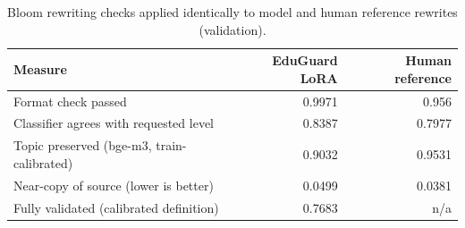 \begin{table}[t]
\centering
\caption{Bloom rewriting checks applied identically to model and human reference rewrites (validation).}
\label{tab:t7_bloom_model_vs_reference}
\begin{tabular}{lrr}
\toprule
Measure & EduGuard LoRA & Human reference \\
\midrule
Format check passed & 0.9971 & 0.956 \\
Classifier agrees with requested level & 0.8387 & 0.7977 \\
Topic preserved (bge-m3, train-calibrated) & 0.9032 & 0.9531 \\
Near-copy of source (lower is better) & 0.0499 & 0.0381 \\
Fully validated (calibrated definition) & 0.7683 & n/a \\
\bottomrule
\end{tabular}
\end{table}

